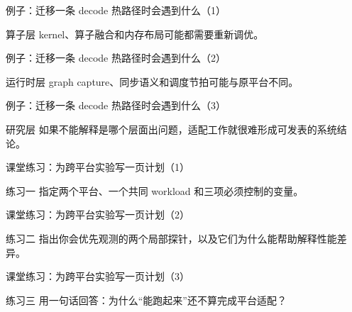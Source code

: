 \begin{frame}{例子：迁移一条 decode 热路径时会遇到什么（1）}
\begin{block}{算子层}
    kernel、算子融合和内存布局可能都需要重新调优。
  \end{block}
\end{frame}

\begin{frame}{例子：迁移一条 decode 热路径时会遇到什么（2）}
\begin{block}{运行时层}
    graph capture、同步语义和调度节拍可能与原平台不同。
  \end{block}
\end{frame}

\begin{frame}{例子：迁移一条 decode 热路径时会遇到什么（3）}
\begin{block}{研究层}
    如果不能解释是哪个层面出问题，适配工作就很难形成可发表的系统结论。
  \end{block}
\end{frame}

\begin{frame}{课堂练习：为跨平台实验写一页计划（1）}
\begin{block}{练习一}
    指定两个平台、一个共同 workload 和三项必须控制的变量。
  \end{block}
\end{frame}

\begin{frame}{课堂练习：为跨平台实验写一页计划（2）}
\begin{block}{练习二}
    指出你会优先观测的两个局部探针，以及它们为什么能帮助解释性能差异。
  \end{block}
\end{frame}

\begin{frame}{课堂练习：为跨平台实验写一页计划（3）}
\begin{block}{练习三}
    用一句话回答：为什么“能跑起来”还不算完成平台适配？
  \end{block}
\end{frame}

